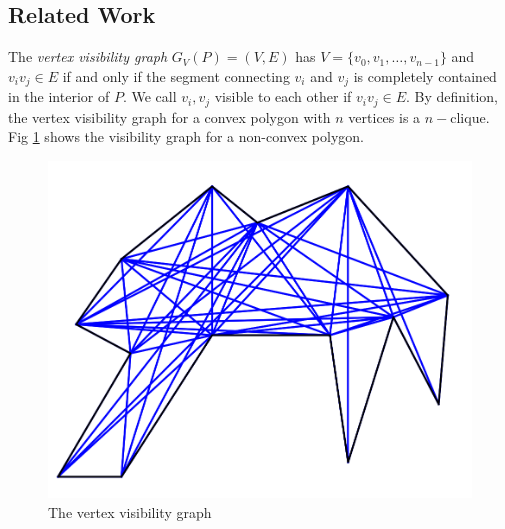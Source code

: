 \documentclass[]{styles/svproc}  %
\begin{document}
%    




\subsection{Related Work}


The \textit{vertex visibility graph} $G_V(P) = (V, E)$ has $V = \{v_0, v_1, \ldots, v_{n-1}\}$ and $v_iv_j\in E$ if and only if the segment connecting $v_i$ and $v_j$ is completely contained in the interior of $P$. We call $v_i, v_j$ visible to each other if $v_iv_j\in E$. By definition, the vertex visibility graph for a convex polygon with $n$ vertices is a $n-$clique. Fig
\ref{fig:vvg} shows the visibility graph for a non-convex polygon.

\begin{figure}
    \includegraphics[width=0.8\linewidth]{figures/viz_graph.png}
    \centering
    \caption{The vertex visibility graph}\label{fig:vvg}
    \centering
\end{figure}
\end{document}
